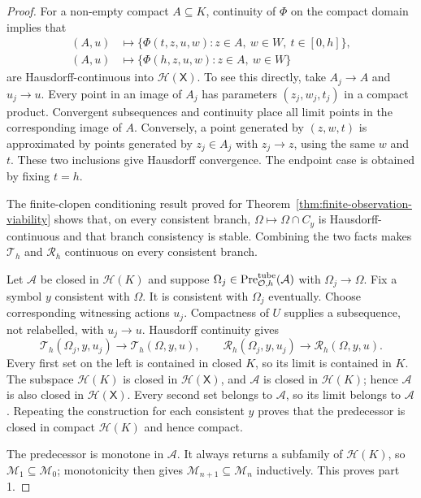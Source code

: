\documentclass[11pt]{article}
\theoremstyle{definition}
\newcommand{\Pre}{\operatorname{Pre}}
\begin{document}
\begin{proof}
For a non-empty compact $A\subseteq K$, continuity of $\Phi$ on the compact
domain implies that
\begin{align*}
(A,u)&\longmapsto
\{\Phi(t,z,u,w):z\in A,\ w\in W,\ t\in[0,h]\},\\
(A,u)&\longmapsto
\{\Phi(h,z,u,w):z\in A,\ w\in W\}
\end{align*}
are Hausdorff-continuous into $\mathcal H(\mathsf X)$.  To see this directly, take
$A_j\to A$ and $u_j\to u$.  Every point in an image of $A_j$ has parameters
$(z_j,w_j,t_j)$ in a compact product.  Convergent subsequences and continuity
place all limit points in the corresponding image of $A$.  Conversely, a
point generated by $(z,w,t)$ is approximated by points generated by
$z_j\in A_j$ with $z_j\to z$, using the same $w$ and $t$.  These two
inclusions give Hausdorff convergence.  The endpoint case is obtained by
fixing $t=h$.

The finite-clopen conditioning result proved for
Theorem~\ref{thm:finite-observation-viability} shows that, on every consistent
branch, $\Omega\mapsto\Omega\cap C_y$ is Hausdorff-continuous and that branch
consistency is stable.  Combining the two facts makes
$\mathscr T_h$ and $\mathscr R_h$ continuous on every consistent branch.

Let $\mathcal A$ be closed in $\mathcal H(K)$ and suppose
$\Omega_j\in\Pre_{\mathcal O,h}^{\rm tube}(\mathcal A)$ with
$\Omega_j\to\Omega$.  Fix a symbol $y$ consistent with $\Omega$.  It is
consistent with $\Omega_j$ eventually.  Choose corresponding witnessing
actions $u_j$.  Compactness of $U$ supplies a subsequence, not relabelled,
with $u_j\to u$.  Hausdorff continuity gives
\[
\mathscr T_h(\Omega_j,y,u_j)\to\mathscr T_h(\Omega,y,u),
\qquad
\mathscr R_h(\Omega_j,y,u_j)\to\mathscr R_h(\Omega,y,u).
\]
Every first set on the left is contained in closed $K$, so its limit is
contained in $K$.  The subspace $\mathcal H(K)$ is closed in
$\mathcal H(\mathsf X)$, and $\mathcal A$ is closed in $\mathcal H(K)$; hence
$\mathcal A$ is also closed in $\mathcal H(\mathsf X)$.  Every second set belongs to
$\mathcal A$, so its limit belongs to $\mathcal A$.  Repeating the construction for each
consistent $y$ proves that the predecessor is closed in compact
$\mathcal H(K)$ and hence compact.

The predecessor is monotone in $\mathcal A$.  It always returns a subfamily
of $\mathcal H(K)$, so $\mathcal M_1\subseteq\mathcal M_0$; monotonicity then
gives $\mathcal M_{n+1}\subseteq\mathcal M_n$ inductively.  This proves
part 1.


\end{proof}
\end{document}

